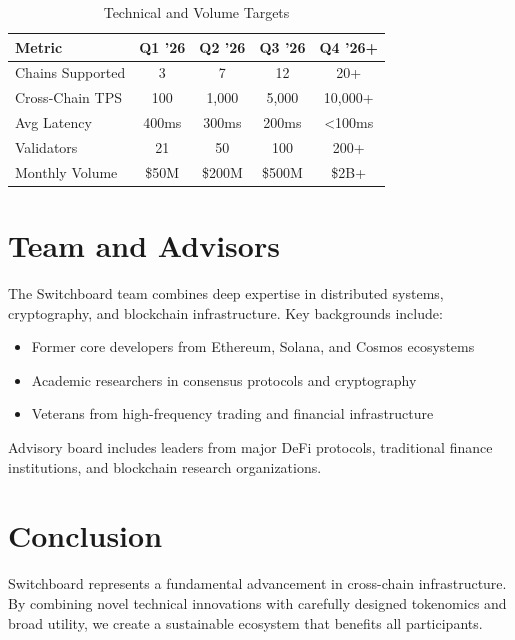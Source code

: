 \documentclass[12pt,a4paper]{article}
\begin{document}
\begin{table}[h]
\centering
\begin{tabular}{lcccc}
\toprule
\textbf{Metric} & \textbf{Q1 '26} & \textbf{Q2 '26} & \textbf{Q3 '26} & \textbf{Q4 '26+} \\
\midrule
Chains Supported & 3 & 7 & 12 & 20+ \\
Cross-Chain TPS & 100 & 1,000 & 5,000 & 10,000+ \\
Avg Latency & 400ms & 300ms & 200ms & <100ms \\
Validators & 21 & 50 & 100 & 200+ \\
Monthly Volume & \$50M & \$200M & \$500M & \$2B+ \\
\bottomrule
\end{tabular}
\caption{Technical and Volume Targets}
\end{table}

\section{Team and Advisors}

The Switchboard team combines deep expertise in distributed systems, cryptography, and blockchain infrastructure. Key backgrounds include:

\begin{itemize}
    \item Former core developers from Ethereum, Solana, and Cosmos ecosystems
    \item Academic researchers in consensus protocols and cryptography
    \item Veterans from high-frequency trading and financial infrastructure
\end{itemize}

Advisory board includes leaders from major DeFi protocols, traditional finance institutions, and blockchain research organizations.

\section{Conclusion}

Switchboard represents a fundamental advancement in cross-chain infrastructure. By combining novel technical innovations with carefully designed tokenomics and broad utility, we create a sustainable ecosystem that benefits all participants.
\end{document}
